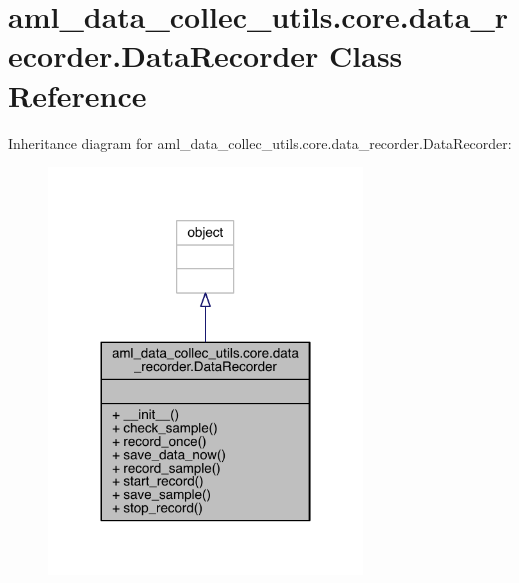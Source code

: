 \hypertarget{classaml__data__collec__utils_1_1core_1_1data__recorder_1_1_data_recorder}{}\section{aml\+\_\+data\+\_\+collec\+\_\+utils.\+core.\+data\+\_\+recorder.\+Data\+Recorder Class Reference}
\label{classaml__data__collec__utils_1_1core_1_1data__recorder_1_1_data_recorder}


Inheritance diagram for aml\+\_\+data\+\_\+collec\+\_\+utils.\+core.\+data\+\_\+recorder.\+Data\+Recorder\+:
\nopagebreak
\begin{figure}[H]
\begin{center}
\leavevmode
\includegraphics[width=236pt]{classaml__data__collec__utils_1_1core_1_1data__recorder_1_1_data_recorder__inherit__graph}
\end{center}
\end{figure}


